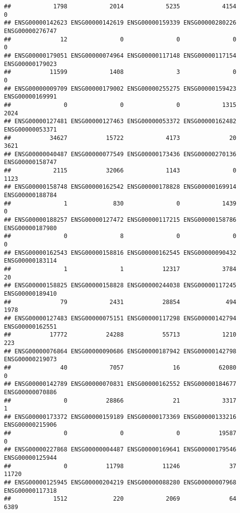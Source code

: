 \documentclass[
]{article}
\begin{document}
\begin{verbatim}
##            1798            2014            5235            4154               0 
## ENSG00000142623 ENSG00000142619 ENSG00000159339 ENSG00000280226 ENSG00000276747 
##              12               0               0               0               0 
## ENSG00000179051 ENSG00000074964 ENSG00000117148 ENSG00000117154 ENSG00000179023 
##           11599            1408               3               0               0 
## ENSG00000009709 ENSG00000179002 ENSG00000255275 ENSG00000159423 ENSG00000169991 
##               0               0               0            1315            2024 
## ENSG00000127481 ENSG00000127463 ENSG00000053372 ENSG00000162482 ENSG00000053371 
##           34627           15722            4173              20            3621 
## ENSG00000040487 ENSG00000077549 ENSG00000173436 ENSG00000270136 ENSG00000158747 
##            2115           32066            1143               0            1123 
## ENSG00000158748 ENSG00000162542 ENSG00000178828 ENSG00000169914 ENSG00000188784 
##               1             830               0            1439               0 
## ENSG00000188257 ENSG00000127472 ENSG00000117215 ENSG00000158786 ENSG00000187980 
##               0               8               0               0               0 
## ENSG00000162543 ENSG00000158816 ENSG00000162545 ENSG00000090432 ENSG00000183114 
##               1               1           12317            3784              20 
## ENSG00000158825 ENSG00000158828 ENSG00000244038 ENSG00000117245 ENSG00000189410 
##              79            2431           28854             494            1978 
## ENSG00000127483 ENSG00000075151 ENSG00000117298 ENSG00000142794 ENSG00000162551 
##           17772           24288           55713            1210             223 
## ENSG00000076864 ENSG00000090686 ENSG00000187942 ENSG00000142798 ENSG00000219073 
##              40            7057              16           62080               0 
## ENSG00000142789 ENSG00000070831 ENSG00000162552 ENSG00000184677 ENSG00000070886 
##               0           28866              21            3317               1 
## ENSG00000173372 ENSG00000159189 ENSG00000173369 ENSG00000133216 ENSG00000215906 
##               0               0               0           19587               0 
## ENSG00000227868 ENSG00000004487 ENSG00000169641 ENSG00000179546 ENSG00000125944 
##               0           11798           11246              37           11720 
## ENSG00000125945 ENSG00000204219 ENSG00000088280 ENSG00000007968 ENSG00000117318 
##            1512             220            2069              64            6389 

\end{verbatim}
\end{document}
